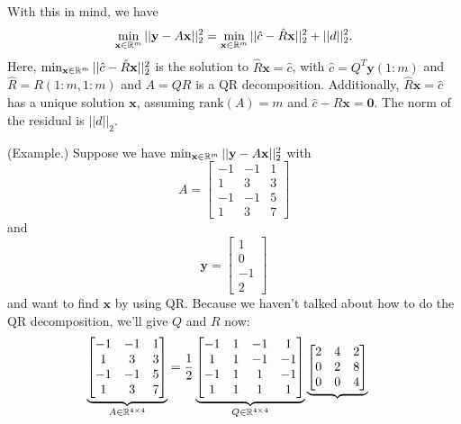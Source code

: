\documentclass[letterpaper]{article}
\newcommand{\0}{\mathbf{0}}
\newcommand{\y}{\mathbf{y}}
\newcommand{\x}{\mathbf{x}}
\begin{document}
With this in mind, we have 
\[\min_{\x \in \R^m} ||\y - A\x||_2^2 = \min_{\x \in \R^m} ||\hat{c} - \hat{R}\x||_2^2 + ||d||_2^2.\]
Here, $\min_{\x \in \R^m} ||\hat{c} - \hat{R}\x||_2^2$ is the solution to $\hat{R}\x = \hat{c}$, with $\hat{c} = Q^T \y(1 : m)$ and $\hat{R} = R(1:m, 1:m)$ and $A = QR$ is a QR decomposition. Additionally, $\hat{R}\x = \hat{c}$ has a unique solution $\x$, assuming $\text{rank}(A) = m$ and $\hat{c} - \hat{R}\x = \0$. The norm of the residual is $||d||_2$. 


\begin{mdframed}
    (Example.) Suppose we have $\min_{\x \in \R^m} ||\y - A\x||_2^2$ with \[A = \begin{bmatrix}
        -1 & -1 & 1 \\ 
        1 & 3 & 3 \\ 
        -1 & -1 & 5 \\ 
        1 & 3 & 7
    \end{bmatrix}\] and \[\y = \begin{bmatrix}
        1 \\ 0 \\ -1 \\ 2
    \end{bmatrix}\] and want to find $\x$ by using QR. Because we haven't talked about how to do the QR decomposition, we'll give $Q$ and $R$ now: 
    \begin{equation*}
        \begin{aligned}
            \underbrace{\begin{bmatrix}
                -1 & -1 & 1 \\ 
                1 & 3 & 3 \\ 
                -1 & -1 & 5 \\ 
                1 & 3 & 7
            \end{bmatrix}}_{A \in \R^{4 \times 4}} &= \frac{1}{2} \underbrace{\begin{bmatrix}
                -1 & 1 & -1 & 1 \\ 
                1 & 1 & -1 & -1 \\ 
                -1 & 1 & 1 & -1 \\ 
                1 & 1 & 1 & 1
            \end{bmatrix}}_{Q \in \R^{4 \times 4}} \underbrace{\begin{bmatrix}
                2 & 4 & 2 \\ 
                0 & 2 & 8 \\ 
                0 & 0 & 4 \\ 

\end{bmatrix}}
\end{aligned}
\end{equation*}
\end{mdframed}
\end{document}
